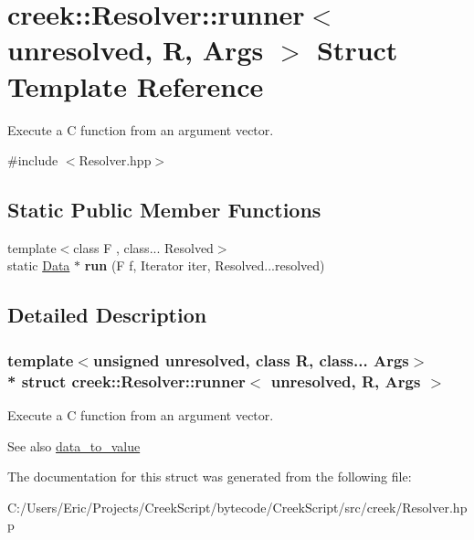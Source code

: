 \hypertarget{structcreek_1_1_resolver_1_1runner}{}\section{creek\+:\+:Resolver\+:\+:runner$<$ unresolved, R, Args $>$ Struct Template Reference}
\label{structcreek_1_1_resolver_1_1runner}


Execute a C function from an argument vector.  




{\ttfamily \#include $<$Resolver.\+hpp$>$}

\subsection*{Static Public Member Functions}
\begin{DoxyCompactItemize}
\item 
{\footnotesize template$<$class F , class... Resolved$>$ }\\static \hyperlink{classcreek_1_1_data}{Data} $\ast$ {\bfseries run} (F f, Iterator iter, Resolved...\+resolved)\hypertarget{structcreek_1_1_resolver_1_1runner_a0c9e99e930870e3d94a0713e3ccf8812}{}\label{structcreek_1_1_resolver_1_1runner_a0c9e99e930870e3d94a0713e3ccf8812}

\end{DoxyCompactItemize}


\subsection{Detailed Description}
\subsubsection*{template$<$unsigned unresolved, class R, class... Args$>$\\*
struct creek\+::\+Resolver\+::runner$<$ unresolved, R, Args $>$}

Execute a C function from an argument vector. 

\begin{DoxySeeAlso}{See also}
\hyperlink{structcreek_1_1_resolver_a5cd23dbbade2472d7cb5ef9407f16963}{data\+\_\+to\+\_\+value} 
\end{DoxySeeAlso}


The documentation for this struct was generated from the following file\+:\begin{DoxyCompactItemize}
\item 
C\+:/\+Users/\+Eric/\+Projects/\+Creek\+Script/bytecode/\+Creek\+Script/src/creek/Resolver.\+hpp\end{DoxyCompactItemize}
